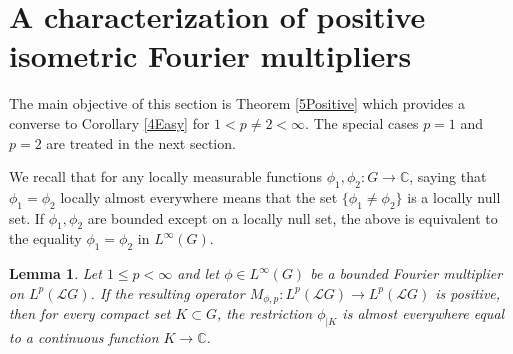 \documentclass[12pt]{amsart}
\newcommand{\Cdb}{\mbox{$\mathbb{C}$}}
\newtheorem{lemma}[theorem]{Lemma}
\theoremstyle{remark}
\theoremstyle{definition}
\numberwithin{equation}{section}
\begin{document}
\medskip
\section{A characterization of positive isometric Fourier multipliers}\label{5}

The main objective of this section is Theorem \ref{5Positive} which provides a converse 
to Corollary \ref{4Easy} for $1<p\not=2<\infty$. The special cases $p=1$ and $p=2$ are treated in the 
next section.



We recall that for any locally measurable functions $\phi_1,\phi_2\colon G\to\Cdb$, saying that 
$\phi_1=\phi_2$ locally almost everywhere means that the set
$\{\phi_1\not=\phi_2\}$ is a locally null set. If $\phi_1,\phi_2$ are 
bounded except on a locally null set, the above is equivalent to
the equality $\phi_1=\phi_2$ in $L^\infty(G)$.



\begin{lemma}\label{5Continuous}
Let $1\leq p<\infty$ and let $\phi\in L^\infty(G)$ be a bounded Fourier 
multiplier on $L^p({\mathcal L}G)$. If  the resulting operator
$M_{\phi,p}\colon L^p({\mathcal L}G)\to L^p({\mathcal L}G)$ is positive, then
for every compact set $K\subset G$, the restriction $\phi_{\vert K}$ is almost everywhere equal 
to a continuous function $K\to\Cdb$.
\end{lemma}
\end{document}

